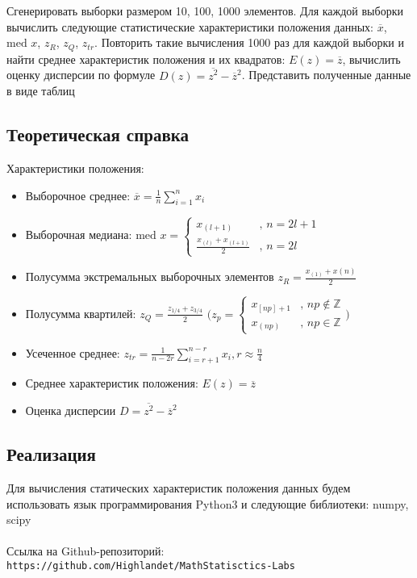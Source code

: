 \documentclass[14pt]{extarticle}
\begin{document}
Сгенерировать выборки размером 10, 100, 1000 элементов. Для каждой выборки вычислить следующие статистические характеристики положения данных: \(\overline{x}\), \(\text{med }x\), \(z_R\), \(z_Q\), \(z_{tr}\). Повторить такие вычисления 1000 раз для каждой выборки и найти среднее характеристик положения и их квадратов: \(E(z)=\overline{z}\), вычислить оценку дисперсии по формуле \(D(z)=\overline{z^2}-\overline{z}^2\). Представить полученные данные в виде таблиц

\subsection{Теоретическая справка}

Характеристики положения:
\begin{itemize}
    \item Выборочное среднее: \(\overline{x} = \frac{1}{n}\sum_{i=1}^n x_i\)
    \item Выборочная медиана: \(\text{med } x = \begin{cases}
    x_{(l+1)}&\text{, } n=2l+1 \\
    \frac{x_{(l)}+x_{(l+1)}}{2}&\text{, } n=2l\end{cases}\)
    \item Полусумма экстремальных выборочных элементов \(z_R=\frac{x_{(1)}+x{(n)}}{2}\)
    \item Полусумма квартилей: \(z_Q=\frac{z_{1/4}+z_{3/4}}{2}\)   \(\big(z_p=\begin{cases}
    x_{[np]+1}&\text{, } np\notin\mathbb{Z} \\
    x_{(np)}&\text{, } np\in\mathbb{Z}\end{cases}\big)\)
    \item Усеченное среднее: \(z_{tr}=\frac{1}{n-2r}\sum_{i=r+1}^{n-r} x_i, r\approx\frac{n}{4}\)
    \item Среднее характеристик положения: \(E(z)=\overline{z}\)
    \item Оценка дисперсии \(D=\overline{z^2}-\overline{z}^2\)
\end{itemize}

\subsection{Реализация}

Для вычисления статических характеристик положения данных будем использовать язык программирования Python3 и следующие библиотеки: numpy, scipy\\\\
Ссылка на Github-репозиторий:\\ \texttt{https://github.com/Highlandet/MathStatisctics-Labs}
\end{document}
